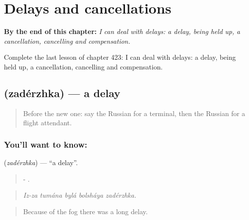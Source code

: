 
\chapter{Delays and cancellations}
\label{ch:ru-delays-and-cancellations}

\begin{chapteropening}
\textbf{By the end of this chapter:} \emph{I can deal with delays: a delay, being held up, a cancellation, cancelling and compensation.}

Complete the last lesson of chapter 423: I can deal with delays: a delay, being held up, a cancellation, cancelling and compensation.
\end{chapteropening}

\section[\texorpdfstring{\ru{задержка} (zadérzhka)}{задержка (zadérzhka)}]{ (zadérzhka) — a delay}

\label{lesson:RU-C423-zaderzhka}



\begin{quote}
Before the new one: say the Russian for a terminal, then the Russian for a flight attendant.
\end{quote}

\subsection*{You'll want to know: }
\textbf{} (\emph{zadérzhka}) — \textquotedblleft{}a delay\textquotedblright{}.

\begin{quote}
-    .
\end{quote}

\begin{quote}
\emph{Iz-za tumána bylá bolsháya zadérzhka.}
\end{quote}

\begin{quote}
Because of the fog there was a long delay.
\end{quote}

